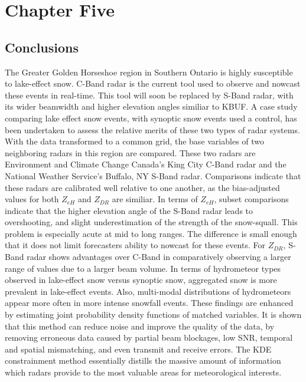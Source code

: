 \chapter{Chapter Five}
\section{Conclusions}
The Greater Golden Horseshoe region in Southern Ontario is highly susceptible to lake-effect snow. C-Band radar is the current tool used to observe and nowcast
these events in real-time. This tool will soon be replaced by S-Band radar, with its wider beamwidth and higher elevation angles similiar to KBUF. A case study comparing lake
effect snow events, with synoptic snow events used a control, has been undertaken to assess the relative merits of these two types of radar systems. With the
data transformed to a common grid, the base variables of two neighboring radars in this region are compared. These two radars are Environment and Climate
Change Canada's King City C-Band radar and the National Weather Service's Buffalo, NY S-Band radar. Comparisons indicate that these radars are calibrated well relative to one another, as the bias-adjusted values for both $Z_{eH}$ and $Z_{DR}$ are similiar. In terms of $Z_{eH}$, subset comparisons indicate that the higher elevation angle of the S-Band radar leads to overshooting, and slight underestimation of the strength of the snow-squall.  This problem is especially 
acute at mid to long ranges. The difference is small enough that it does not limit forecasters ability to nowcast for these events. For $Z_{DR}$, S-Band radar shows advantages over C-Band in comparatively observing a larger range of values due to a larger beam volume. In terms of hydrometeor types observed in lake-effect snow versus synoptic snow, aggregated snow is more prevalent in lake-effect events. Also, multi-modal distributions of hydrometeors appear more often in more intense snowfall events. These findings are enhanced by estimating joint probability density functions of matched variables. It is shown that this method can reduce noise and improve 
the quality of the data, by removing erroneous data caused by partial beam blockages, low SNR, temporal and spatial mismatching, and even transmit and receive errors. The KDE constrainment method essentially distills the massive amount of information which radars provide to the most valuable areas for meteorological interests.